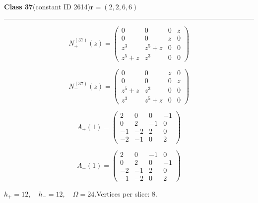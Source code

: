 \noindent\begin{minipage}{\linewidth}
\noindent\textbf{Class 37}\quad\small (constant ID 2614)\hfill $\symbf{r}=(2,2,6,6)$
\par\smallskip\noindent\textcolor{rulegray}{\rule{\linewidth}{0.3pt}}
\begin{minipage}[c]{0.495\linewidth}\centering\fontsize{9.7}{12}\selectfont
\setlength{\abovedisplayskip}{4pt}\setlength{\belowdisplayskip}{4pt}
\setlength{\abovedisplayshortskip}{4pt}\setlength{\belowdisplayshortskip}{4pt}
\setlength{\arraycolsep}{3pt}\renewcommand{\arraystretch}{1.08}
\[N_{+}^{(37)}(z)=\begin{pmatrix}0 & 0 & 0 & z\\0 & 0 & z & 0\\z^{3} & z^{5} + z & 0 & 0\\z^{5} + z & z^{3} & 0 & 0\end{pmatrix}\]
\end{minipage}%
\begin{minipage}[c]{0.495\linewidth}\centering\fontsize{9.7}{12}\selectfont
\setlength{\abovedisplayskip}{4pt}\setlength{\belowdisplayskip}{4pt}
\setlength{\abovedisplayshortskip}{4pt}\setlength{\belowdisplayshortskip}{4pt}
\setlength{\arraycolsep}{3pt}\renewcommand{\arraystretch}{1.08}
\[N_{-}^{(37)}(z)=\begin{pmatrix}0 & 0 & z & 0\\0 & 0 & 0 & z\\z^{5} + z & z^{3} & 0 & 0\\z^{3} & z^{5} + z & 0 & 0\end{pmatrix}\]
\end{minipage}%
\par\noindent
\begin{minipage}[c]{0.495\linewidth}\centering\fontsize{9.7}{12}\selectfont
\setlength{\abovedisplayskip}{4pt}\setlength{\belowdisplayskip}{4pt}
\setlength{\abovedisplayshortskip}{4pt}\setlength{\belowdisplayshortskip}{4pt}
\setlength{\arraycolsep}{3pt}\renewcommand{\arraystretch}{1.08}
\[A_{+}(1)=\begin{pmatrix}2 & 0 & 0 & -1\\0 & 2 & -1 & 0\\-1 & -2 & 2 & 0\\-2 & -1 & 0 & 2\end{pmatrix}\]
\end{minipage}%
\begin{minipage}[c]{0.495\linewidth}\centering\fontsize{9.7}{12}\selectfont
\setlength{\abovedisplayskip}{4pt}\setlength{\belowdisplayskip}{4pt}
\setlength{\abovedisplayshortskip}{4pt}\setlength{\belowdisplayshortskip}{4pt}
\setlength{\arraycolsep}{3pt}\renewcommand{\arraystretch}{1.08}
\[A_{-}(1)=\begin{pmatrix}2 & 0 & -1 & 0\\0 & 2 & 0 & -1\\-2 & -1 & 2 & 0\\-1 & -2 & 0 & 2\end{pmatrix}\]
\end{minipage}%
\par\smallskip\noindent\small $h_+=12,\quad h_-=12,\quad \Omega=24.$\quad Vertices per slice: 8.
\end{minipage}\par\vfill
